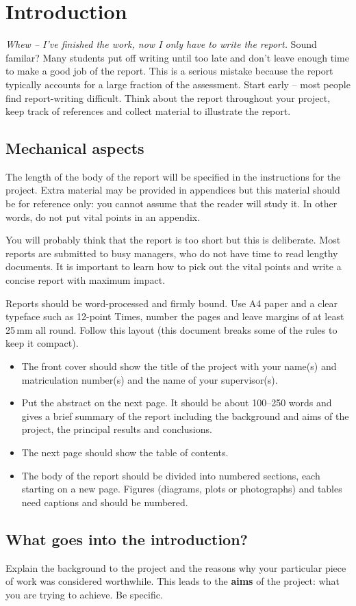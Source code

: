 \section{Introduction}

\emph{Whew -- I've finished the work, now I only have to write the report.} Sound familar? Many students put off writing until too late and don't leave enough time to make a good job of the report. This is a serious mistake because the report typically accounts for a large fraction of the assessment. Start early -- most people find report-writing difficult. Think about the report throughout your project, keep track of references and collect material to illustrate the report.

\subsection{Mechanical aspects}

The length of the body of the report will be specified in the instructions for the project. Extra material may be provided in appendices but this material should be for reference only: you cannot assume that the reader will study it. In other words, do not put vital points in an appendix.

You will probably think that the report is too short but this is deliberate. Most reports are submitted to busy managers, who do not have time to read lengthy documents. It is important to learn how to pick out the vital points and write a concise report with maximum impact.

Reports should be word-processed and firmly bound. Use A4 paper and a clear typeface such as 12-point Times, number the pages and leave margins of at least 25\,mm all round. Follow this layout (this document breaks some of the rules to keep it compact).
\begin{itemize}
\item
The front cover should show the title of the project with your name(s) and matriculation number(s) and the name of your supervisor(s).
\item
Put the abstract on the next page. It should be about 100--250 words and gives a brief summary of the report including the background and aims of the project, the principal results and conclusions.
\item
The next page should show the table of contents. 
\item
The body of the report should be divided into numbered sections, each starting on a new page. Figures (diagrams, plots or photographs) and tables need captions and should be numbered.
\end{itemize}

\subsection{What goes into the introduction?}

Explain the background to the project and the reasons why your particular piece of work was considered worthwhile. This leads to the \textbf{aims} of the project: what you are trying to achieve. Be specific.